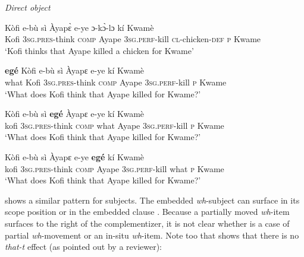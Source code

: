 \documentclass[output=paper]{langscibook}
\begin{document}
\ea \label{ex:devlin:embed-obj}\textit{Direct object}
\begin{xlist}
\ex
\gll  K\`ofi e-b\`{u} s\`{i} \`{A}yap\`{ɛ} e-ye ɔ-k\`{ɔ}-lɔ k\'{i} Kwam\`{e}\\
Kofi \textsc{3sg.pres}-think \textsc{comp} Ayape \textsc{3sg.perf}-kill \textsc{cl}-chicken-\textsc{def} \textsc{p} Kwame\\
\glt `Kofi thinks that Ayape killed a chicken for Kwame’

\ex \label{ex:devlin:full-move}
\gll \textbf{eg\'{e}} K\`{o}fi e-b\`{u} s\`{i} \`{A}yapɛ e-ye k\'{i} Kwam\`{e}\\
what Kofi \textsc{3sg.pres}-think \textsc{comp} Ayape \textsc{3sg.perf}-kill \textsc{p}  Kwame \\
\glt `What does Kofi think that Ayape killed for Kwame?’

\ex \label{ex:devlin:part-move}
\gll  K\`{o}fi e-b\`{u} s\`{i} \textbf{eg\'{e}} \`{A}yapɛ e-ye k\'{i} Kwam\`{e}\\
kofi \textsc{3sg.pres}-think \textsc{comp} what Ayape \textsc{3sg.perf}-kill \textsc{p} Kwame \\
\glt `What does Kofi think that Ayape killed for Kwame?’

\ex \label{ex:devlin:insitu}
\gll K\`{o}fi e-b\`{u} s\`{i} \`{A}yapɛ e-ye \textbf{eg\'{e}} k\'{i} Kwam\`{e}\\
kofi \textsc{3sg.pres}-think \textsc{comp} Ayape \textsc{3sg.perf}-kill what \textsc{p} Kwame \\
\glt `What does Kofi think that Ayape killed for Kwame?’
\end{xlist}
\z


 shows a similar pattern for subjects. The embedded \textit{wh}-subject can surface in its scope position  or in the embedded clause .  Because a partially moved \textit{wh}-item surfaces to the right of the complementizer, it is not clear whether  is a case of partial \textit{wh}-movement or an in-situ \textit{wh}-item. Note too that  shows that there is no \textit{that-t} effect (as pointed out by a reviewer):
\end{document}
